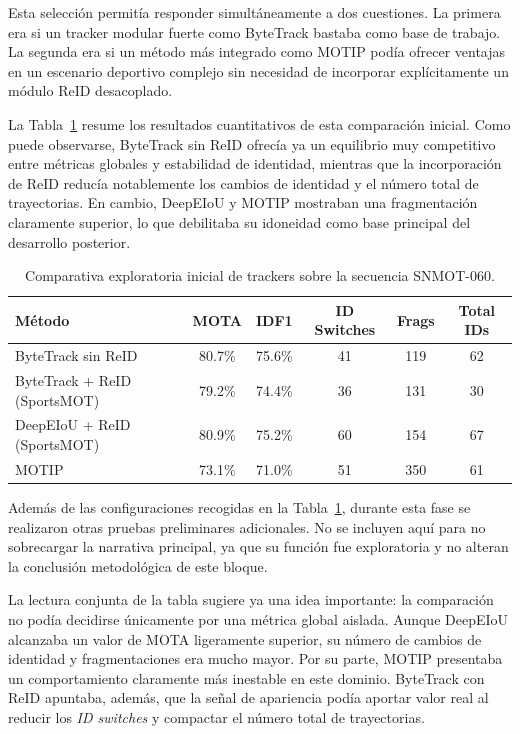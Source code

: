 \documentclass[../MAIN.tex]{subfiles}
\begin{document}
	Esta selección permitía responder simultáneamente a dos cuestiones. La primera era si un tracker modular fuerte como ByteTrack bastaba como base de trabajo. La segunda era si un método más integrado como MOTIP podía ofrecer ventajas en un escenario deportivo complejo sin necesidad de incorporar explícitamente un módulo ReID desacoplado.
	
	La Tabla~\ref{tab:comparativa_inicial_trackers} resume los resultados cuantitativos de esta comparación inicial. Como puede observarse, ByteTrack sin ReID ofrecía ya un equilibrio muy competitivo entre métricas globales y estabilidad de identidad, mientras que la incorporación de ReID reducía notablemente los cambios de identidad y el número total de trayectorias. En cambio, DeepEIoU y MOTIP mostraban una fragmentación claramente superior, lo que debilitaba su idoneidad como base principal del desarrollo posterior.
	
	\begin{table}[H]
		\centering
		\caption{Comparativa exploratoria inicial de trackers sobre la secuencia SNMOT-060.}
		\label{tab:comparativa_inicial_trackers}
		\begin{tabular}{lccccc}
			\toprule
			\textbf{Método} & \textbf{MOTA} & \textbf{IDF1} & \textbf{ID Switches} & \textbf{Frags} & \textbf{Total IDs} \\
			\midrule
			ByteTrack sin ReID           & 80.7\% & 75.6\% & 41 & 119 & 62 \\
			ByteTrack + ReID (SportsMOT) & 79.2\% & 74.4\% & 36 & 131 & 30 \\
			DeepEIoU + ReID (SportsMOT)  & 80.9\% & 75.2\% & 60 & 154 & 67 \\
			MOTIP                        & 73.1\% & 71.0\% & 51 & 350 & 61 \\
			\bottomrule
		\end{tabular}
	\end{table}
	
	Además de las configuraciones recogidas en la Tabla~\ref{tab:comparativa_inicial_trackers}, durante esta fase se realizaron otras pruebas preliminares adicionales. No se incluyen aquí para no sobrecargar la narrativa principal, ya que su función fue exploratoria y no alteran la conclusión metodológica de este bloque.
	
	La lectura conjunta de la tabla sugiere ya una idea importante: la comparación no podía decidirse únicamente por una métrica global aislada. Aunque DeepEIoU alcanzaba un valor de MOTA ligeramente superior, su número de cambios de identidad y fragmentaciones era mucho mayor. Por su parte, MOTIP presentaba un comportamiento claramente más inestable en este dominio. ByteTrack con ReID apuntaba, además, que la señal de apariencia podía aportar valor real al reducir los \textit{ID switches} y compactar el número total de trayectorias.
	
\end{document}
